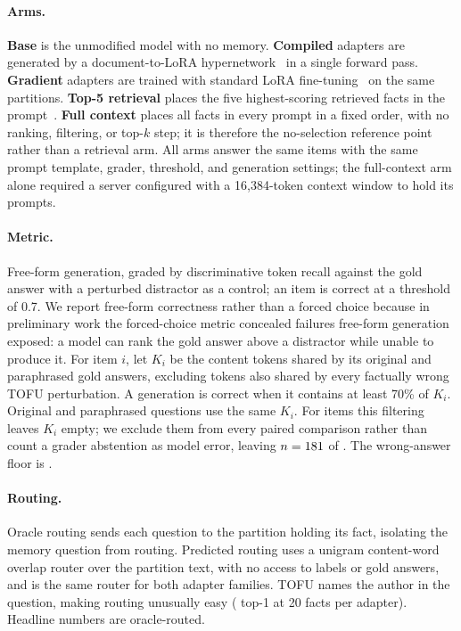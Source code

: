 \documentclass{article}
\begin{document}
\paragraph{Arms.} \textbf{Base} is the unmodified model with no memory.
\textbf{Compiled} adapters are generated by a document-to-LoRA
hypernetwork~\citep{d2l} in a single forward pass. \textbf{Gradient} adapters are
trained with standard LoRA fine-tuning~\citep{lora} on the same partitions.
\textbf{Top-5 retrieval} places the five highest-scoring retrieved facts in the
prompt~\citep{rag}. \textbf{Full context} places all \NPerArm{} facts in every
prompt in a fixed order, with no ranking, filtering, or top-$k$ step; it is
therefore the no-selection reference point rather than a retrieval arm. All arms
answer the same items with the same prompt template, grader, threshold, and
generation settings; the full-context arm alone required a server configured with
a 16{,}384-token context window to hold its prompts.

\paragraph{Metric.} Free-form generation, graded by discriminative token recall
against the gold answer with a perturbed distractor as a control; an item is
correct at a threshold of 0.7. We report free-form correctness rather than a
forced choice because in preliminary work the forced-choice metric concealed
failures free-form generation exposed: a model can rank the gold answer above a
distractor while unable to produce it. For item $i$, let $K_i$ be the content
tokens shared by its original and paraphrased gold answers, excluding tokens
also shared by every factually wrong TOFU perturbation. A generation is correct
when it contains at least 70\% of $K_i$. Original and paraphrased questions use
the same $K_i$. For \NExcluded{} items this filtering leaves $K_i$ empty; we
exclude them from every paired comparison rather than count a grader abstention
as model error, leaving $n=181{}$ of \NPerArm{}. The wrong-answer floor
is \GraderFloor{}.

\paragraph{Routing.} Oracle routing sends each question to the partition holding
its fact, isolating the memory question from routing. Predicted routing uses a
unigram content-word overlap router over the partition text, with no access to
labels or gold answers, and is the same router for both adapter families. TOFU
names the author in the question, making routing unusually easy (\RouterTopOne{}
top-1 at 20 facts per adapter). Headline numbers are oracle-routed.
\end{document}
